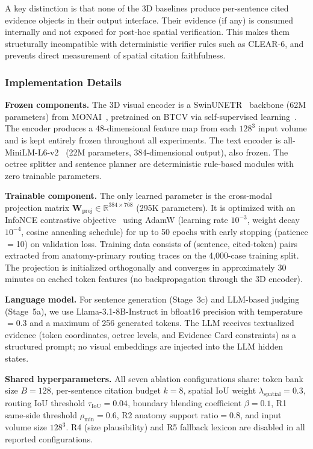A key distinction is that none of the 3D baselines produce per-sentence cited evidence objects in their output interface.
Their evidence (if any) is consumed internally and not exposed for post-hoc spatial verification.
This makes them structurally incompatible with deterministic verifier rules such as \textsc{CLEAR}-6, and prevents direct measurement of spatial citation faithfulness.


\subsubsection{Implementation Details}
\label{sec:implementation}

\noindent\textbf{Frozen components.}
The 3D visual encoder is a SwinUNETR~\cite{hatamizadeh2022swinunetr} backbone (62M parameters) from MONAI~\cite{cardoso2022monai}, pretrained on BTCV via self-supervised learning~\cite{tang2022selfsupervised}.
The encoder produces a 48-dimensional feature map from each $128^3$ input volume and is kept entirely frozen throughout all experiments.
The text encoder is all-MiniLM-L6-v2~\cite{reimers2019sentencebert,wang2020minilm} (22M parameters, 384-dimensional output), also frozen.
The octree splitter and sentence planner are deterministic rule-based modules with zero trainable parameters.

\noindent\textbf{Trainable component.}
The only learned parameter is the cross-modal projection matrix $\mathbf{W}_{\mathrm{proj}}\in\mathbb{R}^{384\times 768}$ (295K parameters).
It is optimized with an InfoNCE contrastive objective~\cite{oord2018cpc} using AdamW (learning rate $10^{-3}$, weight decay $10^{-4}$, cosine annealing schedule) for up to 50 epochs with early stopping (patience$=$10) on validation loss.
Training data consists of (sentence, cited-token) pairs extracted from anatomy-primary routing traces on the 4{,}000-case training split.
The projection is initialized orthogonally and converges in approximately 30 minutes on cached token features (no backpropagation through the 3D encoder).

\noindent\textbf{Language model.}
For sentence generation (Stage~3c) and LLM-based judging (Stage~5a), we use Llama-3.1-8B-Instruct in bfloat16 precision with temperature$=$0.3 and a maximum of 256 generated tokens.
The LLM receives textualized evidence (token coordinates, octree levels, and Evidence Card constraints) as a structured prompt; no visual embeddings are injected into the LLM hidden states.

\noindent\textbf{Shared hyperparameters.}
All seven ablation configurations share: token bank size $B{=}128$, per-sentence citation budget $k{=}8$, spatial IoU weight $\lambda_{\mathrm{spatial}}{=}0.3$, routing IoU threshold $\tau_{\mathrm{IoU}}{=}0.04$, boundary blending coefficient $\beta{=}0.1$, R1 same-side threshold $\rho_{\min}{=}0.6$, R2 anatomy support ratio$=$0.8, and input volume size $128^3$.
R4 (size plausibility) and R5 fallback lexicon are disabled in all reported configurations.

